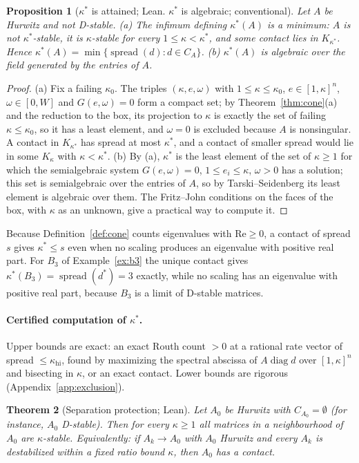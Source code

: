 \documentclass[11pt,a4paper]{article}
\theoremstyle{plain}
\newtheorem{theorem}{Theorem}[section]
\newtheorem{proposition}[theorem]{Proposition}
\theoremstyle{definition}
\newcommand{\diag}{\operatorname{diag}}
\newcommand{\spread}{\operatorname{spread}}
\newcommand{\ks}{\kappa^{*}}
\begin{document}
\begin{proposition}[$\ks$ is attained; Lean. $\ks$ is algebraic; conventional]\label{prop:kappa}
Let $A$ be Hurwitz and not D-stable. (a) The infimum defining $\ks(A)$ is a minimum: $A$ is not $\ks$-stable, it
is $\kappa$-stable for every $1\le\kappa<\ks$, and some contact lies in $K_{\ks}$. Hence
$\ks(A)=\min\{\spread(d):d\in C_A\}$. (b) $\ks(A)$ is algebraic over the field generated by the entries of $A$.
\end{proposition}

\begin{proof}
(a) Fix a failing $\kappa_0$. The triples $(\kappa,e,\omega)$ with $1\le\kappa\le\kappa_0$, $e\in[1,\kappa]^n$,
$\omega\in[0,W]$ and $G(e,\omega)=0$ form a compact set; by Theorem~\ref{thm:cone}(a) and the reduction to the box,
its projection to $\kappa$ is exactly the set of failing $\kappa\le\kappa_0$, so it has a least element, and
$\omega=0$ is excluded because $A$ is nonsingular. A contact in $K_{\ks}$ has spread at most $\ks$, and a contact
of smaller spread would lie in some $K_\kappa$ with $\kappa<\ks$. (b) By (a), $\ks$ is the least element of the set
of $\kappa\ge1$ for which the semialgebraic system $G(e,\omega)=0$, $1\le e_i\le\kappa$, $\omega>0$ has a solution;
this set is semialgebraic over the entries of $A$, so by Tarski--Seidenberg its least element is algebraic over them.
The Fritz--John conditions on the faces of the box, with $\kappa$ as an unknown, give a practical way to compute it.
\end{proof}

Because Definition~\ref{def:cone} counts eigenvalues with $\mathrm{Re}\ge0$, a contact of spread $s$ gives $\ks\le s$
even when no scaling produces an eigenvalue with positive real part. For $B_3$ of Example~\ref{ex:b3} the unique
contact gives $\ks(B_3)=\spread(d^{*})=3$ exactly, while no scaling has an eigenvalue with positive real part,
because $B_3$ is a limit of D-stable matrices.

\paragraph{Certified computation of $\ks$.} Upper bounds are exact: an exact Routh count $>0$ at a rational rate
vector of spread $\le\kappa_{\mathrm{hi}}$, found by maximizing the spectral abscissa of $A\diag d$ over
$[1,\kappa]^n$ and bisecting in $\kappa$, or an exact contact. Lower bounds are rigorous (Appendix~\ref{app:exclusion}).

\begin{theorem}[Separation protection; Lean]\label{thm:separation}
Let $A_0$ be Hurwitz with $C_{A_0}=\emptyset$ (for instance, $A_0$ D-stable). Then for every $\kappa\ge1$ all
matrices in a neighbourhood of $A_0$ are $\kappa$-stable. Equivalently: if $A_k\to A_0$ with $A_0$ Hurwitz and
every $A_k$ is destabilized within a fixed ratio bound $\kappa$, then $A_0$ has a contact.
\end{theorem}
\end{document}

